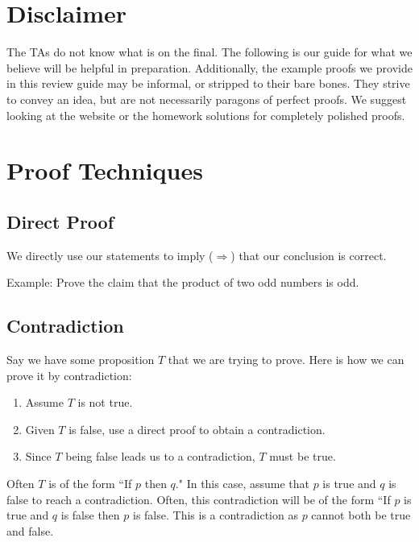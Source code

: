 \documentclass[12pt,letterpaper]{article}
\begin{document}
\section{Disclaimer}

The TAs do not know what is on the final. The following is our guide for what we believe will be helpful in preparation. Additionally, the example proofs we provide in this review guide may be informal, or stripped to their bare bones. They strive to convey an idea, but are not necessarily paragons of perfect proofs. We suggest looking at the website or the homework solutions for completely polished proofs.

\section{Proof Techniques}

    \subsection{Direct Proof}
    
    We directly use our statements to imply ($\Rightarrow$) that our conclusion is correct.
    
    Example: Prove the claim that the product of two odd numbers is odd.
    \begin{mdframed}\vspace{2 cm}\end{mdframed}
    
    \subsection{Contradiction}
    
    Say we have some proposition $T$ that we are trying to prove. Here is how we can  prove it by contradiction:
      \begin{enumerate}
        \item Assume $T$ is not true.
        \item Given $T$ is false, use a direct proof to obtain a contradiction.
        \item Since $T$ being false leads us to a contradiction, $T$ must be true.
      \end{enumerate}
      
    Often $T$ is of the form ``If $p$ then $q$." In this case, assume that $p$ is true and $q$ is false to reach a contradiction. Often, this contradiction will be of the form ``If $p$ is true and $q$ is false then $p$ is false. This is a contradiction as $p$ cannot both be true and false. 
    
\end{document}
